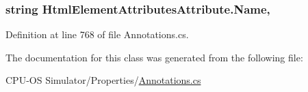 \subsubsection[{Name}]{\setlength{\rightskip}{0pt plus 5cm}string Html\+Element\+Attributes\+Attribute.\+Name\hspace{0.3cm}{\ttfamily [get]}, {}}\label{class_html_element_attributes_attribute_a6d108098ab54c1770cb01df2e1051fd7}


Definition at line 768 of file Annotations.\+cs.



The documentation for this class was generated from the following file\+:\begin{DoxyCompactItemize}
\item 
C\+P\+U-\/\+O\+S Simulator/\+Properties/\hyperlink{_annotations_8cs}{Annotations.\+cs}\end{DoxyCompactItemize}
